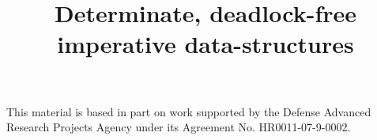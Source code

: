 \documentclass[9pt]{sigplanconf}
\begin{document}
\title{Determinate, deadlock-free imperative data-structures}

\authorinfo{}{}{}


\maketitle



\begin{abstract}

\end{abstract}






\vspace{-0.3cm}


\vspace{-0.3cm}


\vspace{-0.3cm}


\vspace{-0.3cm}


%

%





\acks
This material is based in part on work supported by the Defense Advanced Research Projects Agency under its Agreement No. HR0011-07-9-0002.




%
\end{document}
